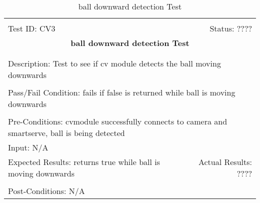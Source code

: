 \documentclass[11pt]{article}
\begin{document}
\begin{center}
\begin{table}[H]
\begin{tabular}{|l r|}\hline&\\[-2mm]
	Test ID: CV3	&Status: ????\\[-3mm]
	\multicolumn{2}{|c|}{\textbf{\large{ball downward detection Test}}}\\&\\\hline&\\[-3mm]
	\multicolumn{2}{|p{\textwidth}|}{Description: Test to see if cv module detects the ball moving downwards}\\[1mm]\hline&\\[-3mm]
	\multicolumn{2}{|p{\textwidth}|}{Pass/Fail Condition: fails if false is returned while ball is moving downwards }\\[1mm]\hline&\\[-3mm]
	\multicolumn{2}{|p{\textwidth}|}{Pre-Conditions: cvmodule successfully connects to camera and smartserve, ball is being detected}\\[4mm]
	\multicolumn{2}{|p{\textwidth}|}{Input: N/A}\\[2mm]\hline
	\multicolumn{1}{|p{0.49\textwidth}}{Expected Results: returns true while ball is moving downwards}	&\multicolumn{1}{|p{0.45\textwidth}|}{Actual Results: ????}\\\hline&\\[-3mm]
	\multicolumn{2}{|p{\textwidth}|}{Post-Conditions: N/A}\\\hline
\end{tabular}
\caption{ball downward detection Test}
\end{table}
\end{center}
\end{document}
